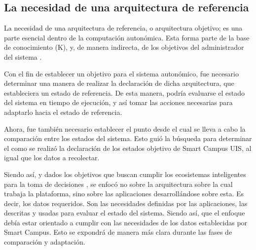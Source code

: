 \subsection{La necesidad de una arquitectura de referencia}

La necesidad de una arquitectura de referencia, o arquitectura objetivo; es una parte esencial dentro de la computación autonómica. Esta forma parte de la base de conocimiento (K), y, de manera indirecta, de los objetivos del administrador del sistema \cite[p. 24]{lalanda_diaconescu_mccann_2014}. 

Con el fin de establecer un objetivo para el sistema autonómico, fue necesario determinar una manera de realizar la declaración de dicha arquitectura, que estableciera un estado de referencia. De esta manera, podría evaluarse el estado del sistema en tiempo de ejecución,  y así tomar las acciones necesarias para adaptarlo hacia el estado de referencia. 

Ahora, fue también necesario establecer el punto desde el cual se lleva a cabo la comparación entre los estados del sistema. Esto guió la búsqueda para determinar el como se realizó la declaración de los estados objetivo de Smart Campus UIS, al igual que los datos a recolectar.

Siendo así, y dados los objetivos que buscan cumplir los ecosistemas inteligentes para la toma de decisiones \cite{Anagnostopoulos_2023}, se enfocó no sobre la arquitectura sobre la cual trabaja la plataforma, sino sobre las aplicaciones desarrollándose sobre esta. Es decir, los datos requeridos. Son las necesidades definidas por las aplicaciones, las descritas y usadas para evaluar el estado del sistema. Siendo así, que el enfoque debía estar orientado a cumplir con las necesidades de los datos establecidas por Smart Campus. Esto se expondrá de manera más clara durante las fases de comparación y adaptación.